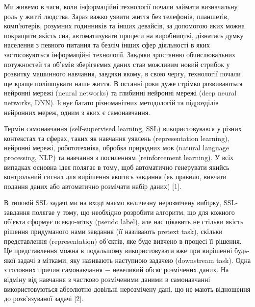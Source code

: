 
\hspace*{26pt}
Ми живемо в часи, коли інформаційні технології почали займати визначальну роль у житті людства. Зараз важко уявити життя без телефонів, планшетів, комп'ютерів, розумних годинників та інших девайсів, за допомогою яких можна покращити якість сна, автоматизувати процеси на виробництві, дізнатись думку населення з певного питання та безліч інших сфер діяльності в яких застосовуються інформаційні технології. Завдяки зростанню обчислювальних потужностей та об'ємів зберігаємих даних став можливим новий стрибок у розвитку машинного навчання, завдяки якому, в свою чергу, технології почали ще краще поліпшувати наше життя. В останні роки дуже стрімко розвиваються нейронні мережі (neural networks) та глибинні нейронні мережі (deep neural networks, DNN). Існує багато різноманітних методологій та підрозділів нейронних мереж, одним з яких є самонавчання.

Термін самонавчання (self-supervised learning, SSL) використовувався у різних контекстах та сферах, таких як навчання уявлень (representation learning), нейронні мережі, робототехніка, обробка природних мов (natural language processing, NLP) та навчання з посиленням (reinforcement learning). У всіх випадках основна ідея полягає в тому, щоб автоматично генерувати якийсь контрольний сигнал для вирішення якогось завдання (як правило, вивчати подання даних або автоматично розмічати набір даних) [1].

В типовiй SSL задачi ми на входi маємо величезну нерозмiчену вибiрку, SSL-завдання полягае у тому, що необхiдно розробити алгоритм, що для кожного об’єкта сформує псевдо-мiтку (pseudo label), але нас цікавить не стільки якість рішення придуманого нами завдання (її називають pretext task), скільки представлення (representation) об'єктів, яке буде вивчено в процесі її рішення. Це представлення можна в подальшому використовувати вже при вирішенні будь-якої задачі з мітками, яку називають наступною задачею (downstream task). Одна з головних причин самонавчання $-$ невеликий обсяг розмічених даних. На відміну від навчання з частково розміченими даними в самонавчанні використовуються абсолютно довільні нерозмічену дані, що не мають відношення до розв'язуваної задачі [2].

